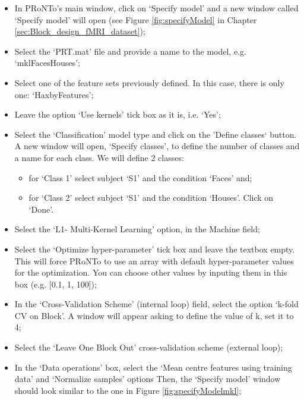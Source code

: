 \begin{itemize}
	
	\item In PRoNTo's main window, click on `Specify model' and a new window called `Specify model' will open (see Figure \ref{fig:specifyModel} in Chapter \ref{sec:Block_design_fMRI_dataset});
	
	\item Select the `PRT.mat' file and provide a name to the model, e.g. `mklFacesHouses';

	\item Select one of the feature sets previously defined. In this case, there is only one: `HaxbyFeatures';

	\item Leave the option `Use kernels' tick box as it is, i.e. `Yes';

	\item	Select the `Classification' model type and click on the 'Define classes` button. A new window will open, `Specify classes', to define the number of classes and a name for each class. We will define 2 classes:
	
		\begin{itemize}
			\item for `Class 1' select subject `S1' and the condition `Faces' and;
			\item for `Class 2' select subject `S1' and the condition `Houses'. Click on `Done'.
		\end{itemize}		
	  
	
	\item Select the `L1- Multi-Kernel Learning' option, in the Machine field;
	
	\item Select the `Optimize hyper-parameter' tick box and leave the textbox empty. This will force PRoNTo to use an array with default hyper-parameter values for the optimization. You can choose other values by inputing them in this box (e.g. [0.1, 1, 100]);
	
	\item In the `Cross-Validation Scheme' (internal loop) field, select the option `k-fold CV on Block'. A window will appear asking to define the value of k, set it to 4;
		
	\item Select the `Leave One Block Out' cross-validation scheme (external loop); 
	
	\item In the `Data operations' box, select the `Mean centre features using training data' and `Normalize samples' options Then, the `Specify model' window should look similar to the one in Figure \ref{fig:specifyModelmkl};
	

\end{itemize}
